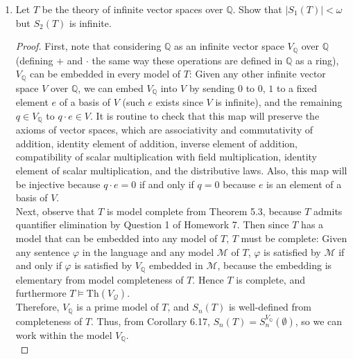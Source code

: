 \documentclass{article}
\begin{document}
\begin{enumerate}[label={\bf Q\arabic*:}]
\begin{proof}
      Hence, the number of types in $S^\mathcal{M}_1(A)$ is
      $|\text{span}(A)|+1\leq|(|A|+\omega)^{<\omega}|+1=|A|+\omega$.
    \end{proof}

  \item Let $T$ be the theory of infinite vector spaces over $\mathbb{Q}$.
    Show that $|S_1(T)|<\omega$ but $S_2(T)$ is infinite.

    \begin{proof}
      First, note that considering $\mathbb{Q}$ as an infinite vector space
      $V_\mathbb{Q}$ over $\mathbb{Q}$ (defining $+$ and $\cdot$ the same
      way these operations are defined in $\mathbb{Q}$ as a ring),
      $V_\mathbb{Q}$ can be embedded in every model of $T$: Given any other
      infinite vector space $V$ over $\mathbb{Q}$, we can embed
      $V_\mathbb{Q}$ into $V$ by sending $0$ to $0$, $1$ to a fixed element
      $e$ of a basis of $V$ (such $e$ exists since $V$ is infinite), and
      the remaining $q\in V_\mathbb{Q}$ to $q\cdot e\in V$. It is routine
      to check that this map will preserve the axioms of vector spaces,
      which are associativity and commutativity of addition, identity
      element of addition, inverse element of addition, compatibility of
      scalar multiplication with field multiplication, identity element of
      scalar multiplication, and the distributive laws. Also, this map will
      be injective because $q\cdot e=0$ if and only if $q=0$ because $e$ is
      an element of a basis of $V$. \\

      Next, observe that $T$ is model complete from Theorem 5.3, because
      $T$ admits quantifier elimination by Question 1 of Homework 7. Then
      since $T$ has a model that can be embedded into any model of $T$, $T$
      must be complete: Given any sentence $\varphi$ in the language and
      any model $\mathcal{M}$ of $T$, $\varphi$ is satisfied by
      $\mathcal{M}$ if and only if $\varphi$ is satisfied by
      $V_\mathbb{Q}$ embedded in $\mathcal{M}$, because the embedding is
      elementary from model completeness of $T$. Hence $T$ is complete, and
      furthermore $T\models\text{Th}(V_\mathcal{Q})$. \\

      Therefore, $V_\mathbb{Q}$ is a prime model of $T$, and $S_n(T)$ is
      well-defined from completeness of $T$. Thus, from Corollary 6.17,
      $S_n(T)= S_n^{V_{\mathbb{Q}}}(\emptyset)$, so we can work within the
      model $V_\mathbb{Q}$. \\


\end{proof}
\end{enumerate}
\end{document}
